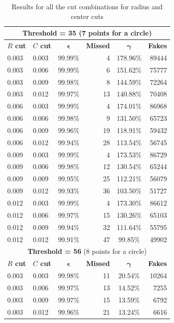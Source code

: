 \documentclass[11pt,twoside]{scrreprt}
\begin{document}
\newpage
\begin{longtable}{llcrcr}
\caption{Results for all the cut combinations for radius and center cuts}\\
\toprule
\multicolumn{6}{c}{\textbf{Threshold = 35} (7 points for a circle)}\\
\midrule
\textbf{$R$ cut} & \textbf{$C$ cut} & $\boldsymbol{\epsilon}$ & \textbf{Missed} & $\boldsymbol{\gamma}$ & \textbf{Fakes} \\
\midrule
0.003 & 0.003 & 99.99\% & 4 & 178.96\% & 89444 \\
0.003 & 0.006 & 99.99\% & 6 & 151.62\% & 75777 \\
0.003 & 0.009 & 99.98\% & 8 & 144.59\% & 72264 \\
0.003 & 0.012 & 99.97\% & 13 & 140.88\% & 70408 \\
0.006 & 0.003 & 99.99\% & 4 & 174.01\% & 86968 \\
0.006 & 0.006 & 99.98\% & 9 & 131.50\% & 65723 \\
0.006 & 0.009 & 99.96\% & 19 & 118.91\% & 59432 \\
0.006 & 0.012 & 99.94\% & 28 & 113.54\% & 56745 \\
0.009 & 0.003 & 99.99\% & 4 & 173.53\% & 86729 \\
0.009 & 0.006 & 99.98\% & 12 & 130.54\% & 65244 \\
0.009 & 0.009 & 99.95\% & 25 & 112.21\% & 56079 \\
0.009 & 0.012 & 99.93\% & 36 & 103.50\% & 51727 \\
0.012 & 0.003 & 99.99\% & 4 & 173.30\% & 86612 \\
0.012 & 0.006 & 99.97\% & 15 & 130.26\% & 65103 \\
0.012 & 0.009 & 99.94\% & 32 & 111.64\% & 55795 \\
0.012 & 0.012 & 99.91\% & 47 & 99.85\% & 49902 \\
\bottomrule
\toprule
\multicolumn{6}{c}{\textbf{Threshold = 56} (8 points for a circle)}\\
\midrule
\textbf{$R$ cut} & \textbf{$C$ cut} & $\boldsymbol{\epsilon}$ & \textbf{Missed} & $\boldsymbol{\gamma}$ & \textbf{Fakes} \\
\midrule
0.003 & 0.003 & 99.98\% & 11 & 20.54\% & 10264 \\
0.003 & 0.006 & 99.97\% & 13 & 14.52\% & 7255 \\
0.003 & 0.009 & 99.97\% & 15 & 13.59\% & 6792 \\
0.003 & 0.012 & 99.96\% & 21 & 13.24\% & 6616 \\

\end{longtable}
\end{document}
